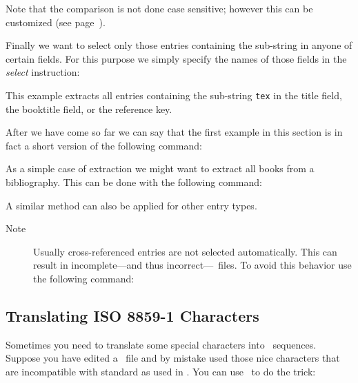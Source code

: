 \documentclass[11pt,a4paper]{scrbook}
\begin{document}
Note that the comparison is not done case sensitive; however this can be
customized (see page~\pageref{sec:extract}).

Finally we want to select only those entries containing the sub-string in
anyone of certain fields. For this purpose we simply specify the names of
those fields in the \textit{select} instruction:


This example extracts all entries containing the sub-string \texttt{tex} in
the title field, the booktitle field, or the reference key.

After we have come so far we can say that the first example in this section is
in fact a short version of the following command:


As a simple case of extraction we might want to extract all books from a
bibliography. This can be done with the following command:


A similar method can also be applied for other entry types.

\begin{description}
\item[Note] Usually cross-referenced entries are not selected automatically.
  This can result in incomplete---and thus incorrect---\BibTeX\ files. To
  avoid this behavior use the following command:


\end{description}

\subsection{Translating ISO 8859-1 Characters}

Sometimes you need to translate some special characters into \BibTeX\
sequences. Suppose you have edited a \BibTeX\ file and by mistake used those
nice characters that are incompatible with standard \ASCII{} as used in
\BibTeX. You can use \BibTool\ to do the trick:

\end{document}
